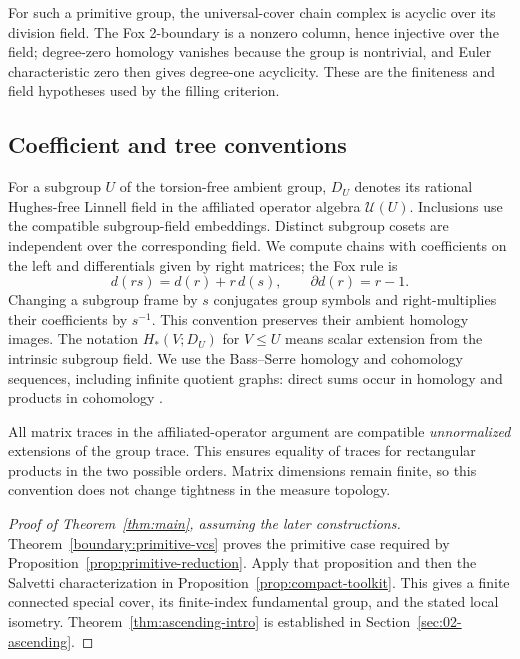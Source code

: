 For such a primitive group, the universal-cover chain complex is acyclic over its division field. The Fox 2-boundary is a nonzero column, hence injective over the field; degree-zero homology vanishes because the group is nontrivial, and Euler characteristic zero then gives degree-one acyclicity. These are the finiteness and field hypotheses used by the filling criterion.

\subsection{Coefficient and tree conventions}

For a subgroup $U$ of the torsion-free ambient group, $D_U$ denotes its rational Hughes-free Linnell field in the affiliated operator algebra $\mathcal U(U)$. Inclusions use the compatible subgroup-field embeddings. Distinct subgroup cosets are independent over the corresponding field. We compute chains with coefficients on the left and differentials given by right matrices; the Fox rule is
\[
d(rs)=d(r)+r\,d(s),\qquad \partial d(r)=r-1.
\]
Changing a subgroup frame by $s$ conjugates group symbols and right-multiplies their coefficients by $s^{-1}$. This convention preserves their ambient homology images. The notation $H_*(V;D_U)$ for $V\le U$ means scalar extension from the intrinsic subgroup field. We use the Bass--Serre homology and cohomology sequences, including infinite quotient graphs: direct sums occur in homology and products in cohomology \cite{Serre1980,Brown1982}.

All matrix traces in the affiliated-operator argument are compatible \emph{unnormalized} extensions of the group trace. This ensures equality of traces for rectangular products in the two possible orders. Matrix dimensions remain finite, so this convention does not change tightness in the measure topology.

\begin{proof}[Proof of Theorem~\ref{thm:main}, assuming the later constructions]
Theorem~\ref{boundary:primitive-vcs} proves the primitive case required by Proposition~\ref{prop:primitive-reduction}. Apply that proposition and then the Salvetti characterization in Proposition~\ref{prop:compact-toolkit}. This gives a finite connected special cover, its finite-index fundamental group, and the stated local isometry. Theorem~\ref{thm:ascending-intro} is established in Section~\ref{sec:02-ascending}.
\end{proof}

